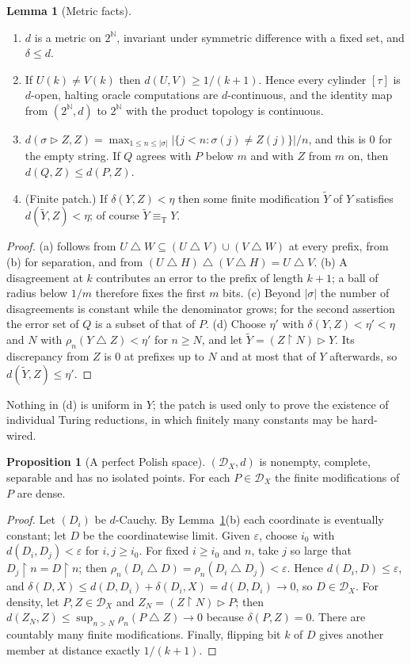 \documentclass[11pt,letterpaper]{article}
\theoremstyle{definition}
\newtheorem{proposition}[definition]{Proposition}
\newtheorem{lemma}[definition]{Lemma}
\numberwithin{equation}{section}
\newcommand{\N}{\mathbb N}
\newcommand{\Cantor}{2^{\N}}
\newcommand{\eqT}{\equiv_{\mathrm T}}
\newcommand{\DX}[1]{\mathcal D_{#1}}
\newcommand{\sd}{\mathbin{\triangle}}
\newcommand{\rest}{\mathbin{\upharpoonright}}
\newcommand{\patch}{\mathbin{\triangleright}}
\newcommand{\src}[1]{\leavevmode{\sffamily\footnotesize\color{Steel}[#1]}}
\begin{document}
\begin{lemma}[Metric facts]\label{lem:metric}\src{R1, R8, R9}
\begin{enumerate}[label=\textup{(\alph*)}]
\item $d$ is a metric on $\Cantor$, invariant under symmetric difference with a fixed set, and $\delta\le d$.
\item If $U(k)\ne V(k)$ then $d(U,V)\ge1/(k+1)$. Hence every cylinder $[\tau]$ is $d$-open, halting oracle computations are $d$-continuous, and the identity map from $(\Cantor,d)$ to $\Cantor$ with the product topology is continuous.
\item $d(\sigma\patch Z,Z)=\max_{1\le n\le|\sigma|}|\{j<n:\sigma(j)\ne Z(j)\}|/n$, and this is $0$ for the empty string. If $Q$ agrees with $P$ below $m$ and with $Z$ from $m$ on, then $d(Q,Z)\le d(P,Z)$.
\item \textup{(Finite patch.)} If $\delta(Y,Z)<\eta$ then some finite modification $\widetilde Y$ of $Y$ satisfies $d(\widetilde Y,Z)<\eta$; of course $\widetilde Y\eqT Y$.
\end{enumerate}
\end{lemma}
\begin{proof}
(a) follows from $U\sd W\subseteq(U\sd V)\cup(V\sd W)$ at every prefix, from (b) for separation, and from $(U\sd H)\sd(V\sd H)=U\sd V$. (b) A disagreement at $k$ contributes an error to the prefix of length $k+1$; a ball of radius below $1/m$ therefore fixes the first $m$ bits. (c) Beyond $|\sigma|$ the number of disagreements is constant while the denominator grows; for the second assertion the error set of $Q$ is a subset of that of $P$. (d) Choose $\eta'$ with $\delta(Y,Z)<\eta'<\eta$ and $N$ with $\rho_n(Y\sd Z)<\eta'$ for $n\ge N$, and let $\widetilde Y=(Z\rest N)\patch Y$. Its discrepancy from $Z$ is $0$ at prefixes up to $N$ and at most that of $Y$ afterwards, so $d(\widetilde Y,Z)\le\eta'$.
\end{proof}
Nothing in (d) is uniform in $Y$; the patch is used only to prove the existence of individual Turing reductions, in which finitely many constants may be hard-wired.

\begin{proposition}[A perfect Polish space]\label{prop:polish}\src{R1, R8, R9}
$(\DX X,d)$ is nonempty, complete, separable and has no isolated points. For each $P\in\DX X$ the finite modifications of $P$ are dense.
\end{proposition}
\begin{proof}
Let $(D_i)$ be $d$-Cauchy. By Lemma~\ref{lem:metric}(b) each coordinate is eventually constant; let $D$ be the coordinatewise limit. Given $\varepsilon$, choose $i_0$ with $d(D_i,D_j)<\varepsilon$ for $i,j\ge i_0$. For fixed $i\ge i_0$ and $n$, take $j$ so large that $D_j\rest n=D\rest n$; then $\rho_n(D_i\sd D)=\rho_n(D_i\sd D_j)<\varepsilon$. Hence $d(D_i,D)\le\varepsilon$, and $\delta(D,X)\le d(D,D_i)+\delta(D_i,X)=d(D,D_i)\to0$, so $D\in\DX X$. For density, let $P,Z\in\DX X$ and $Z_N=(Z\rest N)\patch P$; then $d(Z_N,Z)\le\sup_{n>N}\rho_n(P\sd Z)\to0$ because $\delta(P,Z)=0$. There are countably many finite modifications. Finally, flipping bit $k$ of $D$ gives another member at distance exactly $1/(k+1)$.
\end{proof}
\end{document}
